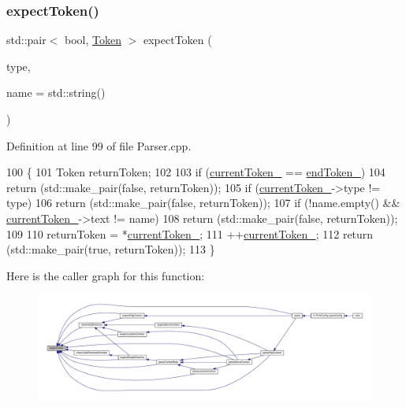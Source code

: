 \subsubsection{\texorpdfstring{expect\+Token()}{expectToken()}}
{\footnotesize\ttfamily std\+::pair$<$ bool, \hyperlink{classft_1_1_token}{Token} $>$ expect\+Token (\begin{DoxyParamCaption}\item[{enum \hyperlink{namespaceft_aa520fbf142ba1e7e659590c07da31921}{Token\+Type}}]{type,  }\item[{const std\+::string \&}]{name = {\ttfamily std\+:\+:string()} }\end{DoxyParamCaption})\hspace{0.3cm}{\ttfamily [private]}}



Definition at line 99 of file Parser.\+cpp.


\begin{DoxyCode}
100     \{
101         Token returnToken;
102 
103         \textcolor{keywordflow}{if} (\hyperlink{classft_1_1_parser_a942c5b794d108f144c5b5028aaa34cb6}{currentToken\_} == \hyperlink{classft_1_1_parser_a538ba3ab8ee1d0cef5cc3c999f3ab44c}{endToken\_})
104             \textcolor{keywordflow}{return} (std::make\_pair(\textcolor{keyword}{false}, returnToken));
105         \textcolor{keywordflow}{if} (\hyperlink{classft_1_1_parser_a942c5b794d108f144c5b5028aaa34cb6}{currentToken\_}->type != type)
106             \textcolor{keywordflow}{return} (std::make\_pair(\textcolor{keyword}{false}, returnToken));
107         \textcolor{keywordflow}{if} (!name.empty() && \hyperlink{classft_1_1_parser_a942c5b794d108f144c5b5028aaa34cb6}{currentToken\_}->text != name)
108             \textcolor{keywordflow}{return} (std::make\_pair(\textcolor{keyword}{false}, returnToken));
109 
110         returnToken = *\hyperlink{classft_1_1_parser_a942c5b794d108f144c5b5028aaa34cb6}{currentToken\_};
111         ++\hyperlink{classft_1_1_parser_a942c5b794d108f144c5b5028aaa34cb6}{currentToken\_};
112         \textcolor{keywordflow}{return} (std::make\_pair(\textcolor{keyword}{true}, returnToken));
113     \}
\end{DoxyCode}
Here is the caller graph for this function\+:
\nopagebreak
\begin{figure}[H]
\begin{center}
\leavevmode
\includegraphics[width=350pt]{classft_1_1_parser_a1615a752d3642bb53598e2c8db810db0_icgraph}
\end{center}
\end{figure}
\mbox{\label{classft_1_1_parser_a8226e5286bd1e9354998fe9e6bb63d08}} 
